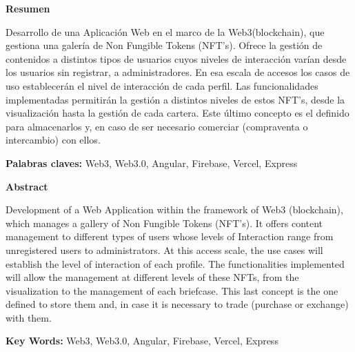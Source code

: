 {\setlength{\parskip}{8mm}
{\huge{\textbf{Resumen}}}

    {\large{ 
        Desarrollo de una Aplicación Web en el marco de la Web3(blockchain), que gestiona una galería de 
        Non Fungible Tokens (NFT’s). Ofrece la gestión de contenidos a distintos tipos de usuarios cuyos niveles de
        interacción varían desde los usuarios sin registrar, a administradores. En esa escala de accesos los
        casos de uso establecerán el nivel de interacción de cada perfil. Las funcionalidades implementadas
        permitirán la gestión a distintos niveles de estos NFT’s, desde la visualización hasta la gestión de cada
        cartera. Este último concepto es el definido para almacenarlos y, en caso de ser necesario comerciar
        (compraventa o intercambio) con ellos.
    }}

    \textbf{Palabras claves:} Web3, Web3.0, Angular, Firebase, Vercel, Express
    


{\huge{\textbf{Abstract}}}

    {\large{
        Development of a Web Application within the framework of Web3 (blockchain), which manages a gallery of
        Non Fungible Tokens (NFT's). It offers content management to different types of users whose levels of
        Interaction range from unregistered users to administrators. At this access scale, the
        use cases will establish the level of interaction of each profile. The functionalities implemented
        will allow the management at different levels of these NFTs, from the visualization to the management of each
        briefcase. This last concept is the one defined to store them and, in case it is necessary to trade
        (purchase or exchange) with them.
    }}

    \textbf{Key Words:} Web3, Web3.0, Angular, Firebase, Vercel, Express
} 